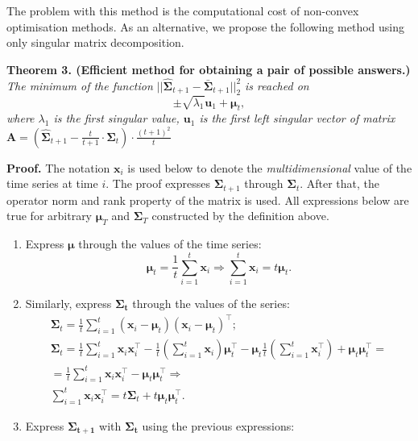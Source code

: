 \documentclass[12pt]{article}
\begin{document}
The problem with this method is the computational cost of non-convex optimisation methods. As an alternative, we propose the following method using only singular matrix decomposition.

{\textbf{Theorem 3. (Efficient method for obtaining a pair of possible answers.)} \emph{ The minimum of the function $||\hat{\mathbf{\Sigma}}_{t+1} - \bar{\mathbf{\Sigma}}_{t+1}||_2^2$ is reached on \[\pm\sqrt{\lambda_1} \mathbf{u}_1 + \boldsymbol{\mu}_t,\] where $\lambda_1$ is the first singular value, $\mathbf{u}_1$ is the first left singular vector of matrix $\mathbf{A}=\left(\hat{\mathbf{\Sigma}}_{t+1} - \frac{t}{t+1} \cdot \mathbf{\Sigma}_t \right) \cdot \frac{(t+1)^2}{t}$}

\textbf{Proof.} The notation $\mathbf{x}_i$ is used below to denote the \emph{multidimensional} value of the time series at time $i$. The proof expresses $\mathbf{\Sigma}_{t+1}$ through $\mathbf{\Sigma}_t$. After that, the operator norm and rank property of the matrix is used. All expressions below are true for arbitrary $\boldsymbol{\mu}_T$ and $\mathbf{\Sigma}_T$ constructed by the definition above.
\begin{enumerate}
	\item Express $\boldsymbol{\mu}$ through the values of the time series: \[\boldsymbol{\mu}_t = \frac{1}{t} \sum_{i=1}^{t} \mathbf{x}_i \Rightarrow \sum_{i=1}^{t} \mathbf{x}_i = t \boldsymbol{\mu}_t.\]
	\item Similarly, express $\mathbf{\Sigma_t}$ through the values of the series:
		\begin{gather*}
		\mathbf{\Sigma}_t = \frac{1}{t} \sum_{i=1}^{t} (\mathbf{x}_i-\boldsymbol{\mu}_t)(\mathbf{x}_i-\boldsymbol{\mu}_t)^\intercal;\\
		\mathbf{\Sigma}_t = \frac{1}{t} \sum_{i=1}^{t} \mathbf{x}_i \mathbf{x}_i^\intercal - \frac{1}{t} \left( \sum_{i=1}^{t} \mathbf{x}_i\right) \boldsymbol{\mu}_t^\intercal - \boldsymbol{\mu}_t \frac{1}{t} \left( \sum_{i=1}^{t} \mathbf{x}_i^\intercal\right) + \boldsymbol{\mu}_t \boldsymbol{\mu}_t^\intercal =\\= \frac{1}{t} \sum_{i=1}^{t} \mathbf{x}_i \mathbf{x}_i^\intercal - \boldsymbol{\mu}_t \boldsymbol{\mu}_t^\intercal \Rightarrow\\
		\sum_{i=1}^{t} \mathbf{x}_i \mathbf{x}_i^\intercal = t \mathbf{\Sigma}_t + t \boldsymbol{\mu}_t \boldsymbol{\mu}_t^\intercal.
		\end{gather*}
	\item Express $\mathbf{\Sigma_{t+1}}$ with $\mathbf{\Sigma_t}$ using the previous expressions:

\end{enumerate}}
\end{document}
